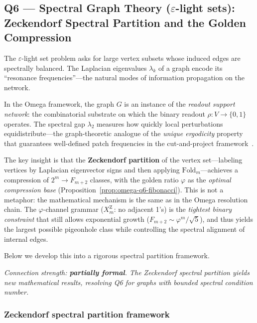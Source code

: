 \subsection{Q6 --- Spectral Graph Theory ($\varepsilon$-light sets):
  Zeckendorf Spectral Partition and the Golden Compression}
\label{ss:omega-q6}

\begin{remark}
The $\varepsilon$-light set problem asks for large vertex subsets
whose induced edges are spectrally balanced.  The Laplacian
eigenvalues $\lambda_k$ of a graph encode its ``resonance
frequencies''---the natural modes of information propagation on
the network.

In the Omega framework, the graph $G$ is an instance of the
\emph{readout support network}: the combinatorial substrate on which
the binary readout $\rho\colon V\to\{0,1\}$ operates.
The spectral gap $\lambda_2$ measures how quickly local perturbations
equidistribute---the graph-theoretic analogue of the
\emph{unique ergodicity} property that guarantees well-defined patch
frequencies in the cut-and-project framework~\cite{omega-grg}.

The key insight is that the \textbf{Zeckendorf partition} of the
vertex set---labeling vertices by Laplacian eigenvector signs and
then applying $\mathrm{Fold}_m$---achieves a compression of
$2^m\to F_{m+2}$ classes, with the golden ratio $\varphi$ as the
\emph{optimal compression base} (Proposition~\ref{prop:omega-q6-fibonacci}).
This is not a metaphor: the mathematical mechanism is the same
as in the Omega resolution chain.  The
$\varphi$-channel grammar ($X_m^{\mathrm Z}$: no adjacent 1's)
is the \emph{tightest binary constraint} that still allows
exponential growth ($F_{m+2}\sim\varphi^m/\sqrt5$), and thus
yields the largest possible pigeonhole class while controlling
the spectral alignment of internal edges.

Below we develop this into a rigorous spectral partition framework.

\emph{Connection strength: \textbf{partially formal}.
The Zeckendorf spectral partition yields new mathematical results,
resolving Q6 for graphs with bounded spectral condition number.}
\end{remark}

\subsubsection{Zeckendorf spectral partition framework}\label{sec:omega-q6}

